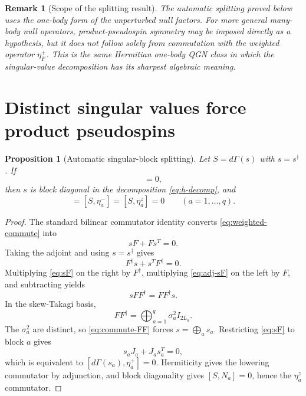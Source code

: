 \documentclass[11pt]{article}
\numberwithin{equation}{section}
\newtheorem{proposition}[theorem]{Proposition}
\newtheorem{remark}[theorem]{Remark}
\begin{document}
\begin{remark}[Scope of the splitting result]
The automatic splitting proved below uses the one-body form of the unperturbed null factors.  For more general many-body null operators, product-pseudospin symmetry may be imposed directly as a hypothesis, but it does not follow solely from commutation with the weighted operator $\eta_F^+$.  This is the same Hermitian one-body QGN class in which the singular-value decomposition has its sharpest algebraic meaning.
\end{remark}

\section{Distinct singular values force product pseudospins}

\begin{proposition}[Automatic singular-block splitting]
\label{prop:block-splitting}
Let $S=d\Gamma(s)$ with $s=s^\dagger$.  If
\begin{equation}
 [S,\eta_F^+]=0,
 \label{eq:weighted-commute}
\end{equation}
then $s$ is block diagonal in the decomposition \eqref{eq:h-decomp}, and
\begin{equation}
 [S,\eta_a^+]=[S,\eta_a^-]=[S,\eta_a^z]=0
 \qquad
 (a=1,\ldots,q).
 \label{eq:all-block-commute}
\end{equation}
\end{proposition}

\begin{proof}
The standard bilinear commutator identity converts \eqref{eq:weighted-commute} into
\begin{equation}
 sF+Fs^T=0.
 \label{eq:sF}
\end{equation}
Taking the adjoint and using $s=s^\dagger$ gives
\begin{equation}
 F^\dagger s+s^TF^\dagger=0.
 \label{eq:adj-sF}
\end{equation}
Multiplying \eqref{eq:sF} on the right by $F^\dagger$, multiplying \eqref{eq:adj-sF} on the left by $F$, and subtracting yields
\begin{equation}
 sFF^\dagger=FF^\dagger s.
 \label{eq:commute-FF}
\end{equation}
In the skew-Takagi basis,
\begin{equation}
 FF^\dagger=\bigoplus_{a=1}^q\sigma_a^2I_{2L_a}.
 \label{eq:FF-spectrum}
\end{equation}
The $\sigma_a^2$ are distinct, so \eqref{eq:commute-FF} forces $s=\bigoplus_as_a$.  Restricting \eqref{eq:sF} to block $a$ gives
\begin{equation}
 s_aJ_a+J_as_a^T=0,
 \label{eq:symplectic-block}
\end{equation}
which is equivalent to $[d\Gamma(s_a),\eta_a^+]=0$.  Hermiticity gives the lowering commutator by adjunction, and block diagonality gives $[S,N_a]=0$, hence the $\eta_a^z$ commutator.
\end{proof}
\end{document}
